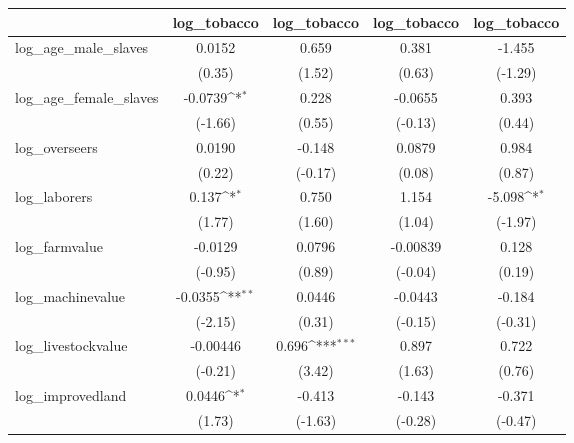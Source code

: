 {
\def\sym#1{\ifmmode^{#1}\else\(^{#1}\)\fi}
\begin{tabular}{l*{4}{c}}
\hline\hline
            &\multicolumn{1}{c}{log\_tobacco}&\multicolumn{1}{c}{log\_tobacco}&\multicolumn{1}{c}{log\_tobacco}&\multicolumn{1}{c}{log\_tobacco}\\
\hline
log\_age\_male\_slaves&      0.0152         &       0.659         &       0.381         &      -1.455         \\
            &      (0.35)         &      (1.52)         &      (0.63)         &     (-1.29)         \\
[1em]
log\_age\_female\_slaves&     -0.0739\sym{*}  &       0.228         &     -0.0655         &       0.393         \\
            &     (-1.66)         &      (0.55)         &     (-0.13)         &      (0.44)         \\
[1em]
log\_overseers&      0.0190         &      -0.148         &      0.0879         &       0.984         \\
            &      (0.22)         &     (-0.17)         &      (0.08)         &      (0.87)         \\
[1em]
log\_laborers&       0.137\sym{*}  &       0.750         &       1.154         &      -5.098\sym{*}  \\
            &      (1.77)         &      (1.60)         &      (1.04)         &     (-1.97)         \\
[1em]
log\_farmvalue&     -0.0129         &      0.0796         &    -0.00839         &       0.128         \\
            &     (-0.95)         &      (0.89)         &     (-0.04)         &      (0.19)         \\
[1em]
log\_machinevalue&     -0.0355\sym{**} &      0.0446         &     -0.0443         &      -0.184         \\
            &     (-2.15)         &      (0.31)         &     (-0.15)         &     (-0.31)         \\
[1em]
log\_livestockvalue&    -0.00446         &       0.696\sym{***}&       0.897         &       0.722         \\
            &     (-0.21)         &      (3.42)         &      (1.63)         &      (0.76)         \\
[1em]
log\_improvedland&      0.0446\sym{*}  &      -0.413         &      -0.143         &      -0.371         \\
            &      (1.73)         &     (-1.63)         &     (-0.28)         &     (-0.47)         \\

\end{tabular}}

